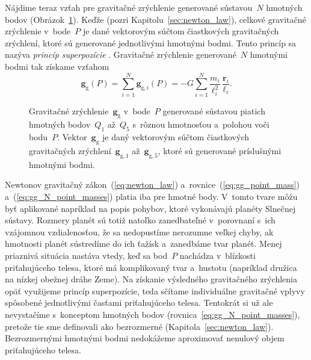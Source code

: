 \documentclass[a4paper, 12pt]{book}
\newcommand{\gidx}{\mathrm g}
\let\vec\mathbf
\begin{document}
Nájdime teraz vzťah pre gravitačné zrýchlenie generované sústavou~$N$ hmotných 
bodov (Obrázok~\ref{fig:gg_n_point_masses}).  Keďže  (pozri 
Kapitolu~\ref{sec:newton_law}), celkové gravitačné zrýchlenie v~bode~$P$ je 
dané vektorovým súčtom čiastkových gravitačných zrýchlení, ktoré sú generované 
jednotlivými hmotnými bodmi.  Tento princíp sa nazýva \emph{princíp 
superpozície} \parencite[pozri napríklad][]{Hotine}.  Gravitačné zrýchlenie 
generované~$N$ hmotnými bodmi tak získame vzťahom
%
\begin{equation}
\label{eq:gg_N_point_masses}
\vec g_\gidx(P) = \sum_{i = 1}^{N}\vec g_{\gidx,i}(P) = -G \sum_{i = 1}^{N}
\frac{m_i}{\ell_i^2} \, \frac{\vec r_i}{\ell_i}{.}
\end{equation}

\begin{figure}
\centering

\caption{Gravitačné zrýchlenie~$\vec g_\gidx$ v~bode~$P$ generované sústavou 
piatich hmotných bodov~$Q_1$ až~$Q_5$ s~rôznou hmotnosťou a~polohou voči 
bodu~$P$.  Vektor~$\vec g_\gidx$ je daný vektorovým súčtom čiastkových 
gravitačných zrýchlení~$\vec g_{\gidx,1}$ až~$\vec g_{\gidx,5}$, ktoré sú 
generované príslušnými hmotnými bodmi.}
\label{fig:gg_n_point_masses}
\end{figure}

Newtonov gravitačný zákon~(\ref{eq:newton_law}) 
a~rovnice~(\ref{eq:gg_point_mass}) a~(\ref{eq:gg_N_point_masses}) platia iba 
pre hmotné body.  V~tomto tvare môžu byť aplikované napríklad na popis pohybov, 
ktoré vykonávajú planéty Slnečnej sústavy.  Rozmery planét sú totiž natoľko 
zanedbateľné v~porovnaní s~ich vzájomnou vzdialenosťou, že sa nedopustíme 
nerozumne veľkej chyby, ak hmotnosti planét sústredíme do ich ťažísk 
a~zanedbáme tvar planét.  Menej priaznivá situácia nastáva vtedy, keď sa 
bod~$P$ nachádza v~blízkosti priťahujúceho telesa, ktoré má komplikovaný tvar 
a~hustotu (napríklad družica na nízkej obežnej dráhe Zeme).  Na získanie 
výsledného gravitačného zrýchlenia opäť využijeme princíp superpozície, teda 
sčítame individuálne gravitačné vplyvy spôsobené jednotlivými časťami 
priťahujúceho telesa.  Tentokrát si už ale nevystačíme s~konceptom hmotných 
bodov (rovnica~\ref{eq:gg_N_point_masses}), pretože tie sme definovali ako 
bezrozmerné (Kapitola~\ref{sec:newton_law}).  Bezrozmernými hmotnými bodmi 
nedokážeme aproximovať nenulový objem priťahujúceho telesa.
\end{document}
